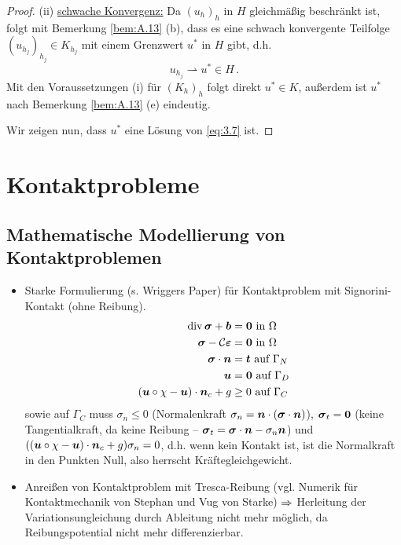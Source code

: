 \begin{itemize}
\begin{proof}
(ii) \underline{schwache Konvergenz:} Da $(u_h)_h$ in $H$ gleichmäßig beschränkt ist, folgt mit Bemerkung \ref{bem:A.13} (b), dass es eine schwach konvergente Teilfolge $(u_{h_j})_{h_j} \in K_{h_j}$ mit einem Grenzwert $u^*$ in $H$ gibt, d.h.
\[
	u_{h_j} \rightharpoonup u^* \in H \, .
\]
Mit den Voraussetzungen (i) für $(K_h)_h$ folgt direkt $u^* \in K$, außerdem ist $u^*$ nach Bemerkung \ref{bem:A.13} (e) eindeutig.

Wir zeigen nun, dass $u^*$ eine Lösung von \eqref{eq:3.7} ist.
\end{proof}
\end{itemize}


\section{Kontaktprobleme}

\subsection{Mathematische Modellierung von Kontaktproblemen}

\begin{itemize}
\item Starke Formulierung (s. Wriggers Paper) für Kontaktproblem mit Signorini-Kontakt (ohne Reibung).
\begin{align}
\operatorname{div} \boldsymbol \sigma + \boldsymbol b &= \boldsymbol 0 \text{ in } \Omega\\
\boldsymbol \sigma  - \mathcal C \boldsymbol {\varepsilon} & = \boldsymbol 0 \text{ in } \Omega\\
\boldsymbol \sigma \cdot \boldsymbol n &= \boldsymbol t  \text{ auf } \Gamma_N \\
\boldsymbol u &= \boldsymbol 0 \text{ auf } \Gamma_D \\
(\boldsymbol u \circ \chi - \boldsymbol u) \cdot \boldsymbol n_c + g& \ge 0 \text{ auf } \Gamma_C
\end{align}
sowie auf $\Gamma_C$ muss $\sigma_n \le 0$ (Normalenkraft $\sigma_n = \boldsymbol n\cdot ( \boldsymbol \sigma \cdot \boldsymbol n)$), $\boldsymbol \sigma_t = \boldsymbol 0$ (keine Tangentialkraft, da keine Reibung – $\boldsymbol \sigma_t = \boldsymbol \sigma \cdot \boldsymbol n - \sigma_n \boldsymbol n$) und $((\boldsymbol u \circ \chi - \boldsymbol u) \cdot \boldsymbol n_c + g)\sigma_n = 0$, d.h. wenn kein Kontakt ist, ist die Normalkraft in den Punkten Null, also herrscht Kräftegleichgewicht.
\item Anreißen von Kontaktproblem mit Tresca-Reibung (vgl. Numerik für Kontaktmechanik von Stephan und Vug von Starke) $\Rightarrow$ Herleitung der Variationsungleichung durch Ableitung nicht mehr möglich, da Reibungspotential nicht mehr differenzierbar.
\end{itemize}

